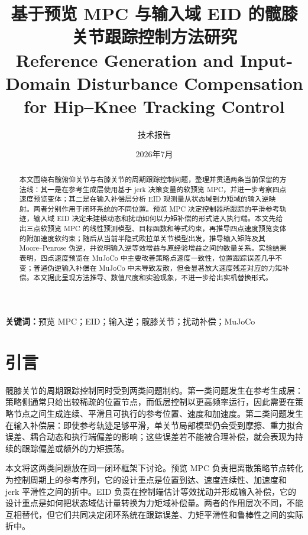 \documentclass[12pt,a4paper]{ctexart}
\title{
    \vspace{2cm}
    \Huge \textbf{\color{mainblue}基于预览 MPC 与输入域 EID 的髋膝关节跟踪控制方法研究} \\[0.5em]
    \Large Reference Generation and Input-Domain Disturbance Compensation for Hip--Knee Tracking Control
}
\author{
    技术报告
}
\date{2026年7月}
\begin{document}
\maketitle
\thispagestyle{empty}

\vspace{1.2cm}

\begin{abstract}
本文围绕右髋俯仰关节与右膝关节的周期跟踪控制问题，整理并贯通两条当前保留的方法线：其一是在参考生成层使用基于 jerk 决策变量的软预览 MPC，并进一步考察四点速度预览变体；其二是在输入补偿层分析 EID 观测量从状态域到力矩域的输入逆映射。两者分别作用于闭环系统的不同位置。预览 MPC 决定控制器所跟踪的平滑参考轨迹，输入域 EID 决定未建模动态和扰动如何以力矩补偿的形式进入执行端。本文先给出三点软预览 MPC 的线性预测模型、目标函数和等式约束，再推导四点速度预览变体的附加速度软约束；随后从当前半隐式欧拉单关节模型出发，推导输入矩阵及其 Moore--Penrose 伪逆，并说明输入逆等效增益与原经验增益之间的数量关系。实验结果表明，四点速度预览在 MuJoCo 中主要改善策略点速度一致性，位置跟踪误差几乎不变；普通伪逆输入补偿在 MuJoCo 中未导致发散，但会显著放大速度残差对应的力矩补偿。本文据此呈现方法推导、数值尺度和实验现象，不进一步给出实机替换形式。
\end{abstract}

\vspace{0.5cm}
\noindent\textbf{关键词：}预览 MPC；EID；输入逆；髋膝关节；扰动补偿；MuJoCo

\newpage
\tableofcontents
\newpage

\section{引言}

髋膝关节的周期跟踪控制同时受到两类问题制约。第一类问题发生在参考生成层：策略侧通常只给出较稀疏的位置节点，而低层控制以更高频率运行，因此需要在策略节点之间生成连续、平滑且可执行的参考位置、速度和加速度。第二类问题发生在输入补偿层：即使参考轨迹足够平滑，单关节局部模型仍会受到摩擦、重力拟合误差、耦合动态和执行端偏差的影响；这些误差若不能被合理补偿，就会表现为持续的跟踪偏差或额外的力矩振荡。

本文将这两类问题放在同一闭环框架下讨论。预览 MPC 负责把离散策略节点转化为控制周期上的参考序列，它的设计重点是位置到达、速度连续性、加速度和 jerk 平滑性之间的折中。EID 负责在控制端估计等效扰动并形成输入补偿，它的设计重点是如何把状态域估计量转换为力矩域补偿量。两者的作用层次不同，不能互相替代，但它们共同决定闭环系统在跟踪误差、力矩平滑性和鲁棒性之间的实际折中。
\end{document}
